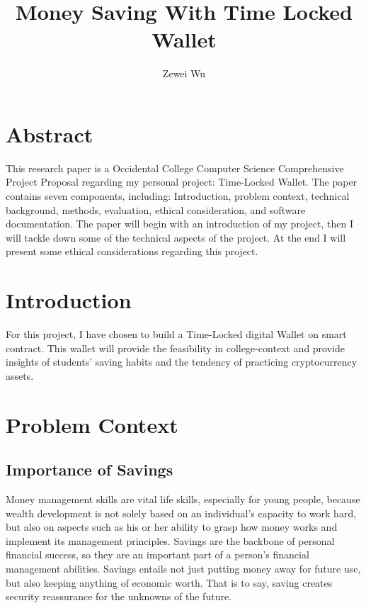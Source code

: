 \documentclass[10pt,twocolumn]{article}
\title{Money Saving With Time Locked Wallet}
\author{Zewei Wu}
\affiliation{Occidental College}
\begin{document}
\maketitle

\section{Abstract}
This research paper is a Occidental College Computer Science Comprehensive Project Proposal regarding my personal project: Time-Locked Wallet. The paper contains seven components, including: Introduction, problem context, technical background, methods, evaluation, ethical consideration, and software documentation. The paper will begin with an introduction of my project, then I will tackle down some of the technical aspects of the project. At the end I will present some ethical considerations regarding this project.

\section{Introduction}

For this project, I have chosen to build a Time-Locked digital Wallet on smart contract. This wallet will provide the feasibility in college-context and provide insights of students' saving habits and the tendency of practicing cryptocurrency assets.


\section{Problem Context}
	
\subsection{Importance of Savings}
Money management skills are vital life skills, especially for young people, because wealth development is not solely based on an individual's capacity to work hard, but also on aspects such as his or her ability to grasp how money works and implement its management principles. Savings are the backbone of personal financial success, so they are an important part of a person's financial management abilities. Savings entails not just putting money away for future use, but also keeping anything of economic worth. That is to say, saving creates security reassurance for the unknowns of the future.\cite{Loibl}
\end{document}
